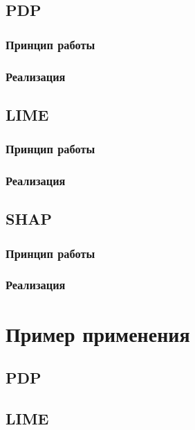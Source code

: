 \documentclass[a4paper, 12pt]{article}
\begin{document}
	\subsection{PDP}
	
	\subsubsection{Принцип работы}
	
	\subsubsection{Реализация}
	
	\subsection{LIME}
	
	\subsubsection{Принцип работы}
	
	\subsubsection{Реализация}
	
	\subsection{SHAP}
	
	\subsubsection{Принцип работы}
	
	\subsubsection{Реализация}
	
	\newpage

	\section{Пример применения}
	
	\newpage
	\subsection{PDP}
	
	\newpage
	\subsection{LIME}
	
\end{document}
